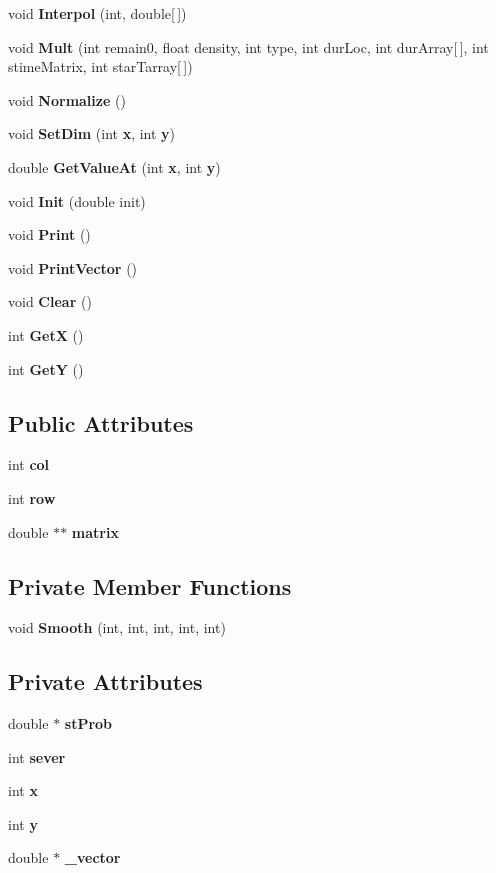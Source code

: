 \begin{CompactItemize}
\item 
void {\bf Interpol} (int, double[$\,$])
\item 
void {\bf Mult} (int remain0, float density, int type, int dur\-Loc, int dur\-Array[$\,$], int stime\-Matrix, int star\-Tarray[$\,$])
\item 
void {\bf Normalize} ()
\item 
void {\bf Set\-Dim} (int {\bf x}, int {\bf y})
\item 
double {\bf Get\-Value\-At} (int {\bf x}, int {\bf y})
\item 
void {\bf Init} (double init)
\item 
void {\bf Print} ()
\item 
void {\bf Print\-Vector} ()
\item 
void {\bf Clear} ()
\item 
int {\bf Get\-X} ()
\item 
int {\bf Get\-Y} ()
\end{CompactItemize}
\subsection*{Public Attributes}
\begin{CompactItemize}
\item 
int {\bf col}
\item 
int {\bf row}
\item 
double $\ast$$\ast$ {\bf matrix}
\end{CompactItemize}
\subsection*{Private Member Functions}
\begin{CompactItemize}
\item 
void {\bf Smooth} (int, int, int, int, int)
\end{CompactItemize}
\subsection*{Private Attributes}
\begin{CompactItemize}
\item 
double $\ast$ {\bf st\-Prob}
\item 
int {\bf sever}
\item 
int {\bf x}
\item 
int {\bf y}
\item 
double $\ast$ {\bf \_\-vector}
\end{CompactItemize}
